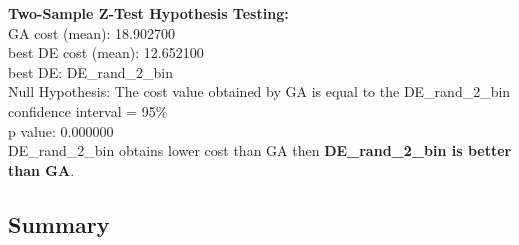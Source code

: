 \documentclass[12pt]{article}
\begin{document}
\noindent
\textbf{Two-Sample Z-Test Hypothesis Testing:}\\
GA cost (mean): 18.902700\\
best DE cost (mean): 12.652100\\
best DE: DE\_rand\_2\_bin\\
Null Hypothesis: The cost value obtained by GA is equal to the DE\_rand\_2\_bin\\
confidence interval = 95\%\\
p value: 0.000000\\
DE\_rand\_2\_bin obtains lower cost than GA then \textbf{DE\_rand\_2\_bin is better than GA}.\\

\begin{landscape}
    \subsection{Summary}
    
\begin{table}[H]
    \centering
    \scriptsize 
\begin{tabular}{rrrrrrrrrrrr}
    \toprule
    

\end{tabular}
\end{table}
\end{landscape}
\end{document}
